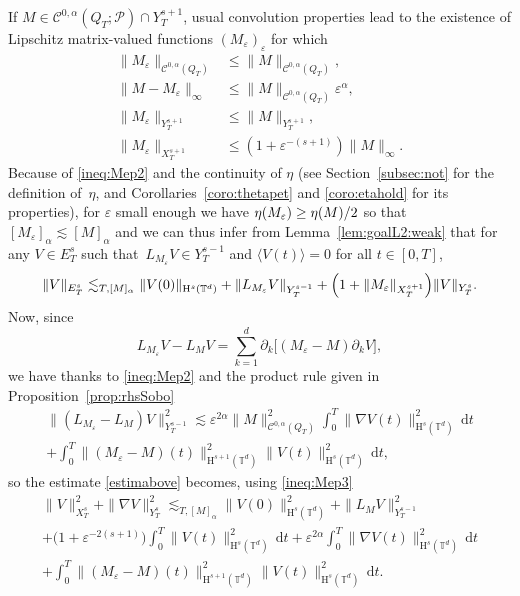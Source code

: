\documentclass[JEP,XML,SOM,Unicode,published]{cedram}
\theoremstyle{definition}
\newcommand\T{\mathbb{T}}
\newcommand\dd{\mathrm{d}}
\renewcommand\H{\mathrm{H}}
\let\ep\varepsilon
\begin{document}
If $M\in\mathscr{C}^{0,\alpha}(Q_T;\mathscr{P})\cap Y_T^{s+1}$, usual convolution properties lead to the existence of Lipschitz matrix-valued functions $(M_\ep)_\ep$ for which
\begin{align}
\label{ineq:Mep1}\|M_\ep\|_{\mathscr{C}^{0,\alpha}(Q_T)}&\leq \|M\|_{\mathscr{C}^{0,\alpha}(Q_T)},\\
\label{ineq:Mep2}\|M-M_\ep\|_\infty&\leq \|M\|_{\mathscr{C}^{0,\alpha}(Q_T)}\ep^\alpha,\\
\label{ineq:Mep2bis}\|M_\ep\|_{Y_T^{s+1}}&\leq \|M\|_{Y_T^{s+1}},\\
\label{ineq:Mep3}\|M_\ep\|_{X_T^{s+1}}&\leq (1+\ep^{-(s+1)})\|M\|_{\infty}.
\end{align}
Because of \eqref{ineq:Mep2} and the continuity of $\eta$ (see Section~\ref{subsec:not} for the definition of~$\eta$, and Corollaries~\ref{coro:thetapet} and \ref{coro:etahold} for its properties), for $\ep$ small enough we have $\eta(M_\ep)\geq\nobreak \eta(M)/2$ so that~$[M_\ep]_\alpha\lesssim[M]_\alpha$ and we can thus infer from Lemma~\ref{lem:goalL2:weak} that for any $V\in E_T^s$ such that~$L_{M _\ep}V\in Y_T^{s-1}$ and $\langle V(t)\rangle = 0$ for all $t\in[0,T]$,\vspace*{-3pt}
\begin{equation}\label{estimabove}
\|V\|_{E_T^s} \lesssim_{T,[M]_\alpha} \|V(0)\|_{\H^s(\T^d)} +\| L_{M_\ep }V \|_{Y_T^{s-1}}
+ \Bigl(1+\|M_\ep\|_{X_T^{s+1}}\Bigr)\|V\|_{Y_T^s}.
\end{equation}
Now, since\vspace*{-5pt}
\[
L_{M_\ep }V-L_{M }V = \sum_{k=1}^d \partial_k \bigl[(M_\ep-M)\partial_k V\bigr],
\]
we have thanks to \eqref{ineq:Mep2} and the product rule given in Proposition~\ref{prop:rhsSobo}\vspace*{-5pt}
\begin{multline*}\|(L_{M_\ep}-L_M)V\|_{Y_T^{s-1}}^2 \lesssim \ep^{2\alpha} \|M\|_{\mathscr{C}^{0,\alpha}(Q_T)}^2 \int_0^T \|\nabla V(t)\|_{\H^s(\T^d)}^2\,\dd t \\+ \int_0^T \|(M_\ep-M)(t)\|_{\H^{s+1}(\T^d)}^2\|V(t)\|_{\H^s(\T^d)}^2\,\dd t,\end{multline*} so the estimate \eqref{estimabove} becomes, using \eqref{ineq:Mep3}\vspace*{-5pt}
\begin{multline*}
\|V\|_{X_T^s}^2 + \|\nabla V\|_{Y_T^s}^2 \lesssim_{T,[M]_\alpha} \|V(0)\|_{\H^s(\T^d)}^2+\| L_{M}V \|_{Y_T^{s-1}}^2 \\
+ \bigl(1+ \ep^{-2(s+1)}\bigr)\int_0^T \|V(t)\|_{\H^s(\T^d)}^2\,\dd t +\ep^{2\alpha} \int_0^T \|\nabla V(t)\|_{\H^s(\T^d)}^2\,\dd t \\
+ \int_0^T \|(M_\ep-M)(t)\|_{\H^{s+1}(\T^d)}^2\|V(t)\|_{\H^s(\T^d)}^2\,\dd t.
\end{multline*}
\end{document}
